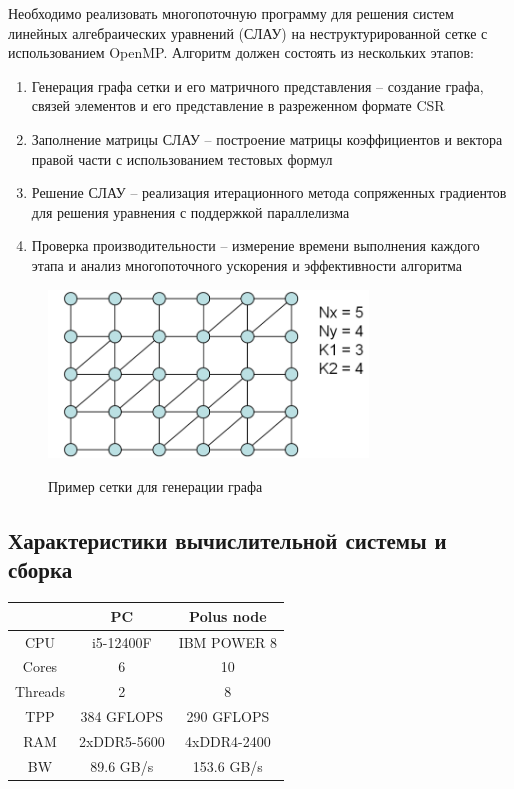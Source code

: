 \documentclass[12pt, a4paper]{article}
\begin{document}
Необходимо реализовать многопоточную программу для решения систем линейных алгебраических уравнений (СЛАУ) на неструктурированной сетке с использованием OpenMP. Алгоритм должен состоять из нескольких этапов:

\begin{enumerate}
	\item Генерация графа сетки и его матричного представления – создание графа, связей элементов и его представление в разреженном формате CSR
	\item Заполнение матрицы СЛАУ – построение матрицы коэффициентов и вектора правой части с использованием тестовых формул
	\item Решение СЛАУ – реализация итерационного метода сопряженных градиентов для решения уравнения с поддержкой параллелизма
	\item Проверка производительности – измерение времени выполнения каждого этапа и анализ многопоточного ускорения и эффективности алгоритма	
\end{enumerate}

\begin{figure}[H]
	\center
	\includegraphics[width=85mm]{grid} \\
	\caption{Пример сетки для генерации графа} 
	\label{fig:grid}
\end{figure}

\newpage

\subsection{Характеристики вычислительной системы и сборка}

\begin{center}
	\setlength{\tabcolsep}{30pt}
	\renewcommand{\arraystretch}{1}
	\begin{tabular}{ c|c|c } 
		& PC & Polus node \\ 
		\hline
		CPU  & i5-12400F & IBM POWER 8 \\ 
		Cores & 6 & 10 \\ 
		Threads & 2 & 8 \\
		TPP & 384 GFLOPS & 290 GFLOPS \\
		RAM & 2xDDR5-5600  & 4xDDR4-2400 \\
		BW & 89.6 GB/s & 153.6 GB/s \\
	\end{tabular}
\end{center}
\end{document}
